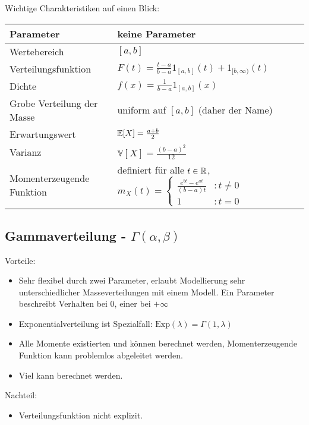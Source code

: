 \documentclass[11pt, a4paper]{book}
\begin{document}
Wichtige Charakteristiken auf einen Blick:
\begin{center}
\begin{tabular}[h]{|l|l|}
\hline
Parameter& keine Parameter \\
\hline
Wertebereich & $[a,b]$\\
\hline
Verteilungsfunktion & $F(t)= \frac{t-a}{b-a}1_{[a,b]}(t)+1_{[b,\infty)}(t) $\\
\hline
Dichte & $f(x)= \frac{1}{b-a}1_{[a,b]}(x)$\\
\hline
Grobe Verteilung der Masse & uniform auf $[a,b]$ (daher der Name)\\
\hline
Erwartungswert& $\mathbb{E}[X]=\frac{a+b}{2}$ \\
\hline
Varianz & $\mathbb V[X]=\frac{(b-a)^2}{12}$\\
\hline
Momenterzeugende Funktion& definiert f\"ur alle $t\in \mathbb{R}$, $m_X(t)=\begin{cases} \frac{e^{bt}-e^{at}}{(b-a)t}&:t\neq 0\\ 1&:t=0 \end{cases}$\\
\hline
\end{tabular}

\end{center}


\subsection{Gammaverteilung - $\Gamma(\alpha,\beta)$}


{Vorteile:} 
\begin{itemize}
\item Sehr flexibel durch zwei Parameter, erlaubt Modellierung sehr unterschiedlicher Masseverteilungen mit einem Modell. Ein Parameter beschreibt Verhalten bei $0$, einer bei $+\infty$
\item Exponentialverteilung ist Spezialfall: $\text{Exp}(\lambda)=\Gamma(1,\lambda)$
\item Alle Momente existierten und k\"onnen berechnet werden, Momenterzeugende Funktion kann problemlos abgeleitet werden.
\item Viel kann berechnet werden.
\end{itemize}

{Nachteil:}
\begin{itemize}
	\item Verteilungsfunktion nicht explizit.
\end{itemize}
\end{document}
